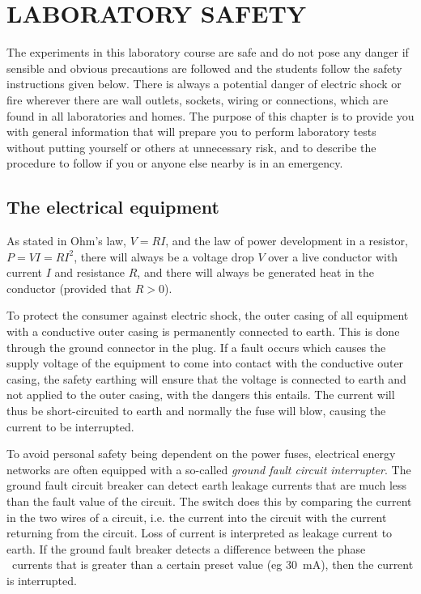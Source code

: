 \documentclass[../Elmag-labhefte-2020.tex]{subfiles}
\begin{document}
\setchapterpreamble[u]{\margintoc}
\chapter{LABORATORY SAFETY \label{ch.elektrisitet}}


The experiments in this laboratory course are safe and do not pose any danger if sensible and obvious precautions are followed and the students follow the safety instructions given below. There is always a potential danger of electric shock or fire wherever there are wall outlets, sockets, wiring or connections, which are found in all laboratories and homes. The purpose of this chapter is to provide you with general information that will prepare you to perform laboratory tests without putting yourself or others at unnecessary risk, and to describe the procedure to follow if you or anyone else nearby is in an emergency.

\section{The electrical equipment}



As stated in Ohm's law, $V = RI$, and the law of power development in a resistor, $P = VI = RI^2$, there will always be a voltage drop $V$ over a live conductor with current $I$ and resistance $R$, and there will always be generated heat in the conductor (provided that $R > 0$).
 

To protect the consumer against electric shock, the outer casing of all equipment with a conductive outer casing is permanently connected to earth. This is done through the ground connector in the plug. If a fault occurs which causes the supply voltage of the equipment to come into contact with the conductive outer casing, the safety earthing will ensure that the voltage is connected to earth and not applied to the outer casing, with the dangers this entails. The current will thus be short-circuited to earth and normally the fuse will blow, causing the current to be interrupted.

To avoid personal safety being dependent on the power fuses, electrical energy networks are often equipped with a so-called \emph{ground fault circuit interrupter}.
The ground fault circuit breaker can detect earth leakage currents that are much less than the fault value of the circuit. The switch does this by comparing the current in the two wires of a circuit, i.e. the current into the circuit with the current returning from the circuit. Loss of current is interpreted as leakage current to earth. If the ground fault breaker detects a difference between the phase \ currents that is greater than a certain preset value (eg \SI{30}{\milli\ampere}), then the current is interrupted.
\end{document}
